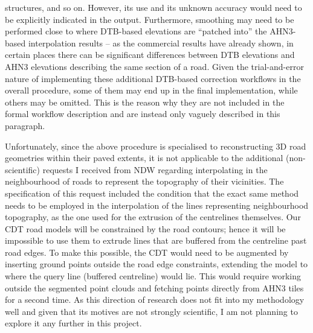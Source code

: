 structures, and so on. However, its use and its unknown accuracy would need to be explicitly indicated in the output. Furthermore, smoothing may need to be performed close to where DTB-based elevations are “patched into” the AHN3-based interpolation results – as the commercial results have already shown, in certain places there can be significant differences between DTB elevations and AHN3 elevations describing the same section of a road. Given the trial-and-error nature of implementing these additional DTB-based correction workflows in the overall procedure, some of them may end up in the final implementation, while others may be omitted. This is the reason why they are not included in the formal workflow description and are instead only vaguely described in this paragraph.

Unfortunately, since the above procedure is specialised to reconstructing 3D road geometries within their paved extents, it is not applicable to the additional (non-scientific) requests I received from NDW regarding interpolating in the neighbourhood of roads to represent the topography of their vicinities. The specification of this request included the condition that the exact same method needs to be employed in the interpolation of the lines representing neighbourhood topography, as the one used for the extrusion of the centrelines themselves. Our CDT road models will be constrained by the road contours; hence it will be impossible to use them to extrude lines that are buffered from the centreline past road edges. To make this possible, the CDT would need to be augmented by inserting ground points outside the road edge constraints, extending the model to where the query line (buffered centreline) would lie. This would require working outside the segmented point clouds and fetching points directly from AHN3 tiles for a second time. As this direction of research does not fit into my methodology well and given that its motives are not strongly scientific, I am not planning to explore it any further in this project.

